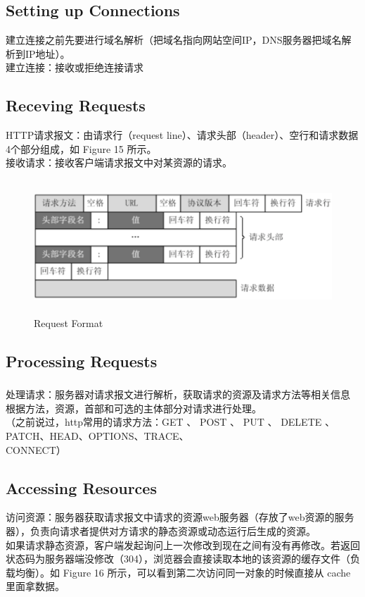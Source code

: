 \documentclass{article}
\begin{document}
	\subsection{Setting up Connections}
	\begin{CJK}{UTF8}{gbsn}
		建立连接之前先要进行域名解析（把域名指向网站空间IP，DNS服务器把域名解析到IP地址）。\\
		建立连接：接收或拒绝连接请求
	\end{CJK}{}

	\subsection{Receving Requests}
	\begin{CJK}{UTF8}{gbsn}
		HTTP请求报文：由请求行（request line）、请求头部（header）、空行和请求数据4个部分组成，如 Figure 15 所示。\\ 
		接收请求：接收客户端请求报文中对某资源的请求。
	\end{CJK}{}

	\begin{figure}[H]
		\centering
		\includegraphics[height = 5cm, width = 14cm]{pics/28_request_format.png}	
		\caption{Request Format}
	\end{figure}

	\subsection{Processing Requests}
	\begin{CJK}{UTF8}{gbsn}
		\subparagraph{}
		处理请求：服务器对请求报文进行解析，获取请求的资源及请求方法等相关信息 根据方法，资源，首部和可选的主体部分对请求进行处理。\\
		（之前说过，http常用的请求方法：GET 、 POST 、 PUT 、 DELETE 、 PATCH、HEAD、OPTIONS、TRACE、\\
		CONNECT）
	\end{CJK}{}

	\subsection{Accessing Resources}
	\indent 
	\begin{CJK}{UTF8}{gbsn}
		\indent 访问资源：服务器获取请求报文中请求的资源web服务器（存放了web资源的服务器），负责向请求者提供对方请求的静态资源或动态运行后生成的资源。\\
		\indent 如果请求静态资源，客户端发起询问上一次修改到现在之间有没有再修改。若返回状态码为服务器端没修改（304），浏览器会直接读取本地的该资源的缓存文件（负载均衡）。如 Figure 16 所示，可以看到第二次访问同一对象的时候直接从 cache 里面拿数据。
	\end{CJK}{}
\end{document}
